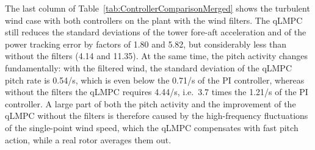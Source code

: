The last column of Table~\ref{tab:ControllerComparisonMerged} shows the turbulent wind case with both controllers on the plant with the wind filters. The qLMPC still reduces the standard deviations of the tower fore-aft acceleration and of the power tracking error by factors of 1.80 and 5.82, but considerably less than without the filters (4.14 and 11.35). At the same time, the pitch activity changes fundamentally: with the filtered wind, the standard deviation of the qLMPC pitch rate is 0.54\textdegree/s, which is even below the 0.71\textdegree/s of the PI controller, whereas without the filters the qLMPC requires 4.44\textdegree/s, i.e.\ 3.7 times the 1.21\textdegree/s of the PI controller. A large part of both the pitch activity and the improvement of the qLMPC without the filters is therefore caused by the high-frequency fluctuations of the single-point wind speed, which the qLMPC compensates with fast pitch action, while a real rotor averages them out.


